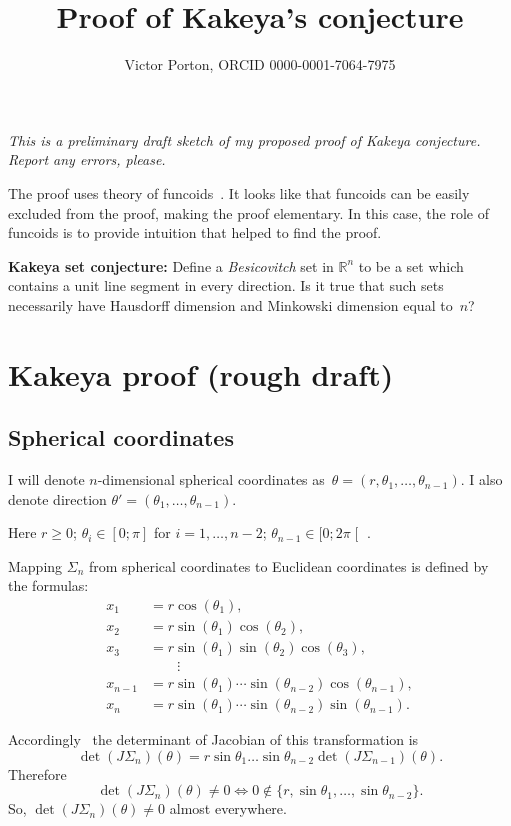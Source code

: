 \documentclass{amsart}
\title{Proof of Kakeya's conjecture}
\author{Victor Porton, ORCID 0000-0001-7064-7975}
\begin{document}
\maketitle  

\emph{This is a preliminary draft sketch of my proposed proof of Kakeya conjecture. Report any errors, please.}

The proof uses theory of funcoids~\cite{volume-1}. It looks like that funcoids can be easily excluded from the proof, making the proof elementary. In this case, the role of funcoids is to provide intuition that helped to find the proof.

\textbf{Kakeya set conjecture:} Define a \emph{Besicovitch} set in $\mathbb{R}^n$ to be a set which contains a unit line segment in every direction. Is it true that such sets necessarily have Hausdorff dimension and Minkowski dimension equal to~$n$?

\section{Kakeya proof (rough draft)}

\subsection{Spherical coordinates}

I will denote $n$-dimensional spherical coordinates as~$\theta=(r, \theta_1,\dots,\theta_{n-1})$.
I also denote direction $\theta'=(\theta_1,\dots,\theta_{n-1})$.

Here $r\geq 0$; $\theta_i\in[0;\pi]$ for $i=1,\dots,n-2$; $\theta_{n-1}\in[0;2\pi\mathclose[$ .

Mapping $\Sigma_n$ from spherical coordinates to Euclidean coordinates is defined by the formulas:
\[
\begin{aligned}x_{1}&=r\cos(\theta _{1}),\\x_{2}&=r\sin(\theta _{1})\cos(\theta _{2}),\\x_{3}&=r\sin(\theta _{1})\sin(\theta _{2})\cos(\theta _{3}),\\&\qquad \vdots \\x_{n-1}&=r\sin(\theta _{1})\cdots \sin(\theta _{n-2})\cos(\theta _{n-1}),\\x_{n}&=r\sin(\theta _{1})\cdots \sin(\theta _{n-2})\sin(\theta _{n-1}).\end{aligned}
\]

Accordingly~\cite{polar-jacobian} the determinant of Jacobian of this transformation is
\[ \det (J\Sigma_n)(\theta) = r\sin\theta_1\dots\sin\theta_{n-2}\det (J\Sigma_{n-1})(\theta). \]
Therefore
\[
\det (J\Sigma_n)(\theta)\ne 0\Leftrightarrow 0\notin\{r,\sin\theta_1,\dots,\sin\theta_{n-2}\}.
\]
So, $\det (J\Sigma_n)(\theta)\ne 0$ almost everywhere.
\end{document}
